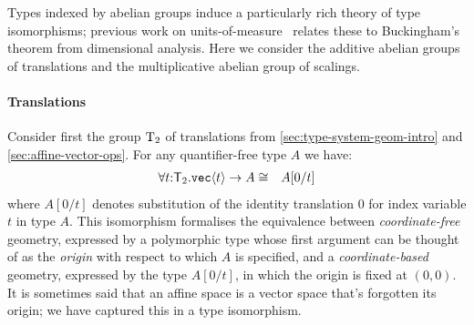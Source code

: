 Types indexed by abelian groups induce a particularly rich theory of
type isomorphisms; previous work on
units-of-measure~\cite{kennedy97relational} relates these to
Buckingham's theorem from dimensional analysis. Here we consider the
additive abelian groups of translations and the multiplicative abelian
group of scalings.

\paragraph{Translations} 
Consider first the group $\mathrm{T}_2$ of translations from
\autoref{sec:type-system-geom-intro} and 
\autoref{sec:affine-vector-ops}. For any quantifier-free type $A$
we have: %
\begin{eqnarray*}
\forall t\mathord:\mathsf{T}_2.\textup{\texttt{vec}}\langle t \rangle\to A
& \cong &
A[0/t]
\end{eqnarray*}
where $A[0/t]$ denotes substitution of the identity translation $0$
for index variable $t$ in type $A$. This isomorphism formalises the
equivalence between \emph{coordinate-free} geometry, expressed by a
polymorphic type whose first argument can be thought of as the
\emph{origin} with respect to which $A$ is specified, and a
\emph{coordinate-based} geometry, expressed by the type $A[0/t]$, in
which the origin is fixed at $(0,0)$. It is sometimes said that an
affine space is a vector space that's forgotten its origin; we have
captured this in a type isomorphism.

